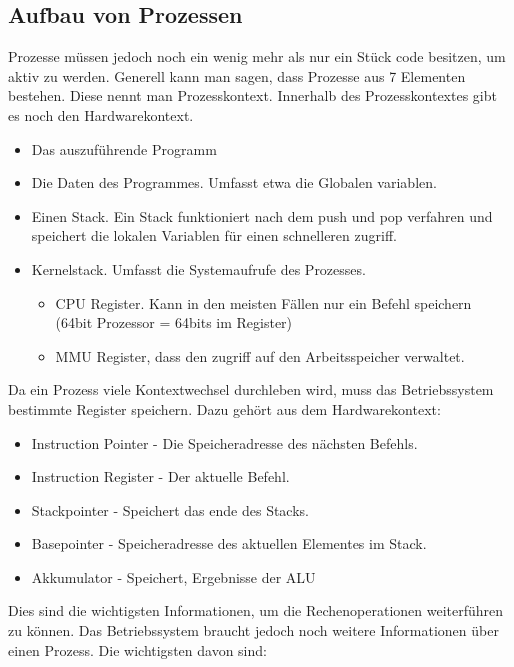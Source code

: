 \subsection{Aufbau von Prozessen}

Prozesse müssen jedoch noch ein wenig mehr als nur ein Stück code besitzen, um aktiv zu werden. Generell kann man sagen, dass Prozesse aus 7 Elementen bestehen.
Diese nennt man Prozesskontext. Innerhalb des Prozesskontextes gibt es noch den Hardwarekontext.
\begin{itemize}
    \setlength\itemsep{0pt}
    \item Das auszuführende Programm
    \item Die Daten des Programmes. Umfasst etwa die Globalen variablen.
    \item Einen Stack. Ein Stack funktioniert nach dem push und pop verfahren und speichert die lokalen Variablen für einen schnelleren zugriff.
    \item Kernelstack. Umfasst die Systemaufrufe des Prozesses.
          \begin{itemize}
              \item CPU Register. Kann in den meisten Fällen nur ein Befehl speichern (64bit Prozessor = 64bits im Register)
              \item MMU Register, dass den zugriff auf den Arbeitsspeicher verwaltet.
          \end{itemize}
\end{itemize}

Da ein Prozess viele Kontextwechsel durchleben wird, muss das Betriebssystem bestimmte Register speichern. Dazu gehört aus dem Hardwarekontext:

\begin{itemize}
    \setlength\itemsep{0pt}
    \item Instruction Pointer - Die Speicheradresse des nächsten Befehls.
    \item Instruction Register - Der aktuelle Befehl.
    \item Stackpointer - Speichert das ende des Stacks.
    \item Basepointer - Speicheradresse des aktuellen Elementes im Stack.
    \item Akkumulator - Speichert, Ergebnisse der ALU
\end{itemize}

Dies sind die wichtigsten Informationen, um die Rechenoperationen weiterführen zu können. Das Betriebssystem braucht jedoch noch weitere Informationen über einen Prozess. Die wichtigsten davon sind:

